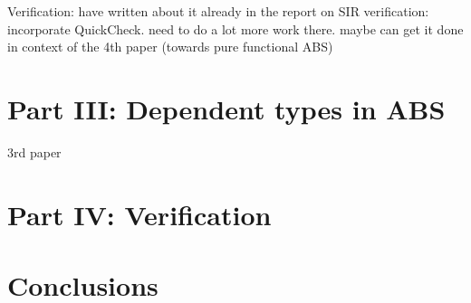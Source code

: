 \documentclass[oneside]{book}
\begin{document}
Verification:
have written about it already in the report on SIR verification: incorporate QuickCheck. need to do a lot more work there. maybe can get it done in context of the 4th paper (towards pure functional ABS)

\chapter{Part III: Dependent types in ABS}
3rd paper

\chapter{Part IV: Verification}

\chapter{Conclusions}



\end{document}
